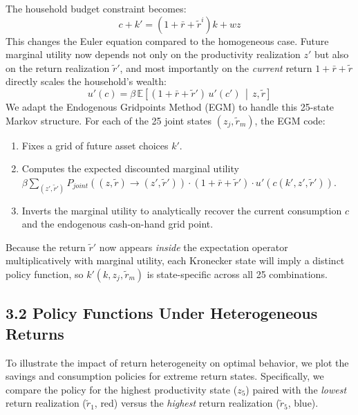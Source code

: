 \documentclass[11pt, a4paper]{article}
\begin{document}
The household budget constraint becomes:
\begin{equation}
    c + k' = (1 + \bar{r} + \tilde{r}^i) k + w z
\end{equation}
This changes the Euler equation compared to the homogeneous case. Future marginal utility now depends not only on the productivity realization $z'$ but also on the return realization $\tilde{r}'$, and most importantly on the \emph{current} return $1 + \bar{r} + \tilde{r}$ directly scales the household's wealth:
\begin{equation}
    u'(c) = \beta \, \mathbb{E}\left[ (1 + \bar{r} + \tilde{r}') \, u'(c') \,\middle|\, z, \tilde{r} \right]
\end{equation}
We adapt the Endogenous Gridpoints Method (EGM) to handle this 25-state Markov structure. For each of the 25 joint states $(z_j, \tilde{r}_m)$, the EGM code:
\begin{enumerate}
    \item Fixes a grid of future asset choices $k'$.
    \item Computes the expected discounted marginal utility $\beta \sum_{(z', \tilde{r}')} P_{joint}((z,\tilde{r}) \to (z',\tilde{r}')) \cdot (1 + \bar{r} + \tilde{r}') \cdot u'(c(k', z', \tilde{r}'))$.
    \item Inverts the marginal utility to analytically recover the current consumption $c$ and the endogenous cash-on-hand grid point.
\end{enumerate}
Because the return $\tilde{r}'$ now appears \emph{inside} the expectation operator multiplicatively with marginal utility, each Kronecker state will imply a distinct policy function, so $k'(k, z_j, \tilde{r}_m)$ is state-specific across all 25 combinations.

\subsection*{3.2 Policy Functions Under Heterogeneous Returns}

To illustrate the impact of return heterogeneity on optimal behavior, we plot the savings and consumption policies for extreme return states. Specifically, we compare the policy for the highest productivity state ($z_5$) paired with the \emph{lowest} return realization ($\tilde{r}_1$, red) versus the \emph{highest} return realization ($\tilde{r}_5$, blue).
\end{document}
